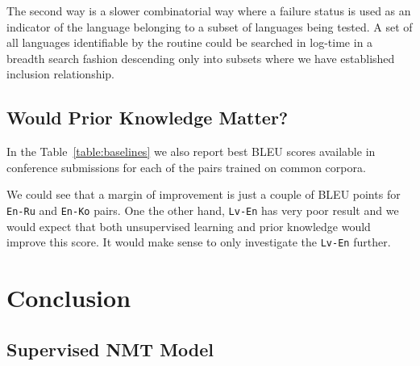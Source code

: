 \documentclass[]{article}
\begin{document}
The second way is a slower combinatorial way where a failure status is used as an indicator of the language belonging to a subset of languages being tested.
A set of all languages identifiable by the routine could be searched in log-time in a breadth search fashion descending only into subsets where we have established inclusion relationship.

\subsection{Would Prior Knowledge Matter?}
\label{sect:prior}

In the Table~\ref{table:baselines} we also report best BLEU scores available in conference submissions for each of the pairs trained on common corpora.

We could see that a margin of improvement is just a couple of BLEU points for {\tt En-Ru} and {\tt En-Ko} pairs.
One the other hand, {\tt Lv-En} has very poor result and we would expect that both unsupervised learning and prior knowledge would improve this score.
It would make sense to only investigate the {\tt Lv-En} further.

\section{Conclusion}

\small




\begin{appendices}
\section{Supervised NMT Model}
\label{appendix:supervised}

\end{appendices}
\end{document}
